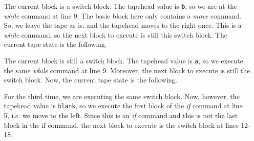 \begin{appendices}
\begin{figure}[H]
\end{figure}
\noindent The current block is a switch block. The tapehead value is \texttt{b}, so we are at the \textit{while} command at line 9. The basic block here only contains a \textit{move} command. So, we leave the tape as is, and the tapehead moves to the right once. This is a \textit{while} command, so the next block to execute is still this switch block. The current tape state is the following.
\begin{figure}[H]
    \centering
\end{figure}
\noindent The current block is still a switch block. The tapehead value is \texttt{a}, so we execute the same \textit{while} command at line 9. Moreover, the next block to execute is still the switch block. Now, the current tape state is the following.
\begin{figure}[H]
    \centering
\end{figure}
\noindent For the third time, we are executing the same switch block. Now, however, the tapehead value is \texttt{blank}, so we execute the first block of the \textit{if} command at line 5, i.e. we move to the left. Since this is an \textit{if} command and this is not the last block in the if command, the next block to execute is the switch block at lines 12-18.
\begin{figure}[H]
    \centering
\end{figure}
\end{appendices}
